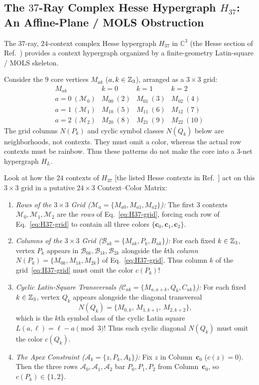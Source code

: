 \documentclass[aps,pra,reprint,superscriptaddress,longbibliography,nofootinbib,floatfix,10pt]{revtex4-2}
\theoremstyle{definition}\newtheorem{definition}[theorem]{Definition}
\theoremstyle{remark}\newtheorem{remark}[theorem]{Remark}
\newcommand{\C}{\mathbb C}\newcommand{\R}{\mathbb R}\newcommand{\Q}{\mathbb Q}
\begin{document}
\subsection{The \texorpdfstring{$37$}{37}-Ray Complex Hesse Hypergraph \texorpdfstring{$H_{37}$}{H37}: An Affine-Plane / MOLS Obstruction}\label{sec:H37}

The $37$-ray, $24$-context complex Hesse hypergraph $H_{37}$ in $\C^3$ (the Hesse section of Ref.~\cite{svozil2026contexts}) provides a context hypergraph organized by a finite-geometry Latin-square / MOLS skeleton.

Consider the $9$ core vertices $M_{ak}$ ($a,k\in\mathbb Z_3$), arranged as a $3\times 3$ grid:
\begin{equation}\label{eq:H37-grid}
\begin{array}{c|ccc}
M_{ak} & k=0 & k=1 & k=2\\\hline
a=0\ (\mathcal{M}_0) & M_{00}\ (2) & M_{01}\ (3) & M_{02}\ (4)\\
a=1\ (\mathcal{M}_1) & M_{10}\ (5) & M_{11}\ (6) & M_{12}\ (7)\\
a=2\ (\mathcal{M}_2) & M_{20}\ (8) & M_{21}\ (9) & M_{22}\ (10)
\end{array}
\end{equation}
The grid columns $N(P_k)$ and cyclic symbol classes $N(Q_k)$ below are neighborhoods, not contexts. They must omit a color, whereas the actual row contexts must be rainbow. Thus these patterns do not make the core into a $3$-net hypergraph $H_L$.

Look at how the $24$ contexts of $H_{37}$ [the listed Hesse contexts in Ref.~\cite{svozil2026contexts}] act on this $3\times 3$ grid in a putative $24\times 3$ Context--Color Matrix:
\begin{enumerate}
\item \emph{Rows of the $3\times 3$ Grid ($\mathcal{M}_a=\{M_{a0},M_{a1},M_{a2}\}$):} The first $3$ contexts $\mathcal{M}_0,\mathcal{M}_1,\mathcal{M}_2$ are the \emph{rows} of Eq.~\eqref{eq:H37-grid}, forcing each row of Eq.~\eqref{eq:H37-grid} to contain all three colors $\{\mathbf{c}_0,\mathbf{c}_1,\mathbf{c}_2\}$.
\item \emph{Columns of the $3\times 3$ Grid ($\mathcal{B}_{ak}=\{M_{ak},P_k,B_{ak}\}$):} For each fixed $k\in\mathbb Z_3$, vertex $P_k$ appears in $\mathcal{B}_{0k},\mathcal{B}_{1k},\mathcal{B}_{2k}$ alongside the $k$th \emph{column} $N(P_k)=\{M_{0k},M_{1k},M_{2k}\}$ of Eq.~\eqref{eq:H37-grid}. Thus column $k$ of the grid~\eqref{eq:H37-grid} must omit the color $c(P_k)$!
\item \emph{Cyclic Latin-Square Transversals ($\mathcal{C}_{ak}=\{M_{a,a+k},Q_k,C_{ak}\}$):} For each fixed $k\in\mathbb Z_3$, vertex $Q_k$ appears alongside the diagonal transversal
\[
N(Q_k)=\{M_{0,k},\,M_{1,k+1},\,M_{2,k+2}\},
\]
which is the $k$th symbol class of the cyclic Latin square $L(a,\ell)=\ell-a\pmod 3$! Thus each cyclic diagonal $N(Q_k)$ must omit the color $c(Q_k)$.
\item \emph{The Apex Constraint ($\mathcal{A}_k=\{z,P_k,A_k\}$):} Fix $z$ in Column~$\mathbf{c}_0$ ($c(z)=0$). Then the three rows $\mathcal{A}_0,\mathcal{A}_1,\mathcal{A}_2$ bar $P_0,P_1,P_2$ from Column~$\mathbf{c}_0$, so $c(P_k)\in\{1,2\}$.
\end{enumerate}
\end{document}
